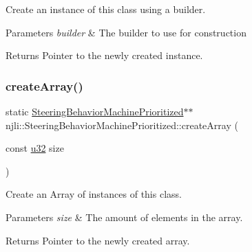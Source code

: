 Create an instance of this class using a builder.


\begin{DoxyParams}{Parameters}
{\em builder} & The builder to use for construction\\
\hline
\end{DoxyParams}
\begin{DoxyReturn}{Returns}
Pointer to the newly created instance. 
\end{DoxyReturn}
\mbox{\label{classnjli_1_1_steering_behavior_machine_prioritized_aa0bbfb3b91471a27b5c892fd437d2c09}} 
\subsubsection{\texorpdfstring{create\+Array()}{createArray()}}
{\footnotesize\ttfamily static \mbox{\hyperlink{classnjli_1_1_steering_behavior_machine_prioritized}{Steering\+Behavior\+Machine\+Prioritized}}$\ast$$\ast$ njli\+::\+Steering\+Behavior\+Machine\+Prioritized\+::create\+Array (\begin{DoxyParamCaption}\item[{const \mbox{\hyperlink{_util_8h_a10e94b422ef0c20dcdec20d31a1f5049}{u32}}}]{size }\end{DoxyParamCaption})\hspace{0.3cm}{\ttfamily [static]}}

Create an Array of instances of this class.


\begin{DoxyParams}{Parameters}
{\em size} & The amount of elements in the array.\\
\hline
\end{DoxyParams}
\begin{DoxyReturn}{Returns}
Pointer to the newly created array. 
\end{DoxyReturn}
\mbox{\label{classnjli_1_1_steering_behavior_machine_prioritized_a45cfd44a2c65038473e7ac18a4971585}} 
